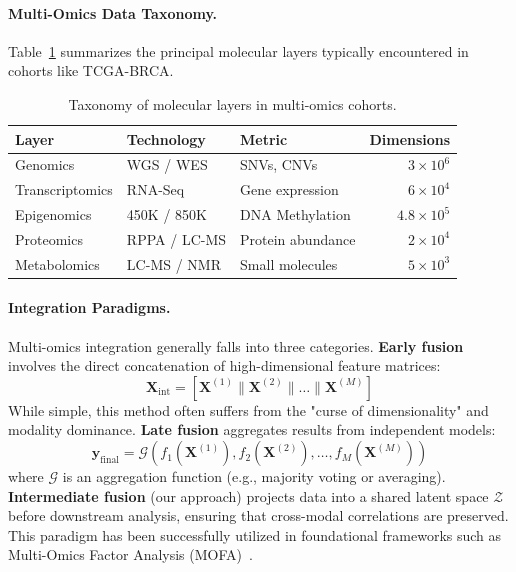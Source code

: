 \documentclass[runningheads]{llncs}
\begin{document}
\paragraph{Multi-Omics Data Taxonomy.}
Table~\ref{tab:taxonomy} summarizes the principal molecular layers typically encountered in cohorts like TCGA-BRCA.

\begin{table}[H]
\caption{Taxonomy of molecular layers in multi-omics cohorts.}\label{tab:taxonomy}
\centering
\small
\begin{tabular}{l l l r}
\toprule
\textbf{Layer} & \textbf{Technology} & \textbf{Metric} & \textbf{Dimensions} \\
\midrule
Genomics        & WGS / WES     & SNVs, CNVs        & $3 \times 10^6$ \\
Transcriptomics & RNA-Seq       & Gene expression   & $6 \times 10^4$ \\
Epigenomics     & 450K / 850K   & DNA Methylation   & $4.8 \times 10^5$ \\
Proteomics      & RPPA / LC-MS  & Protein abundance & $2 \times 10^4$ \\
Metabolomics    & LC-MS / NMR   & Small molecules   & $5 \times 10^3$ \\
\bottomrule
\end{tabular}
\end{table}

\paragraph{Integration Paradigms.}
Multi-omics integration generally falls into three categories.
\textbf{Early fusion} involves the direct concatenation of high-dimensional feature matrices:
\begin{equation}
\mathbf{X}_{\text{int}} = \left[ \mathbf{X}^{(1)} \parallel \mathbf{X}^{(2)} \parallel \dots \parallel \mathbf{X}^{(M)} \right]
\end{equation}
While simple, this method often suffers from the "curse of dimensionality" and modality dominance.
\textbf{Late fusion} aggregates results from independent models:
\begin{equation}
\mathbf{y}_{\text{final}} = \mathcal{G}(f_1(\mathbf{X}^{(1)}), f_2(\mathbf{X}^{(2)}), \dots, f_M(\mathbf{X}^{(M)}))
\end{equation}
where $\mathcal{G}$ is an aggregation function (e.g., majority voting or averaging).
\textbf{Intermediate fusion} (our approach) projects data into a shared latent space $\mathcal{Z}$ before downstream analysis, ensuring that cross-modal correlations are preserved. This paradigm has been successfully utilized in foundational frameworks such as Multi-Omics Factor Analysis (MOFA)~\cite{argelaguet2018}.
\end{document}
